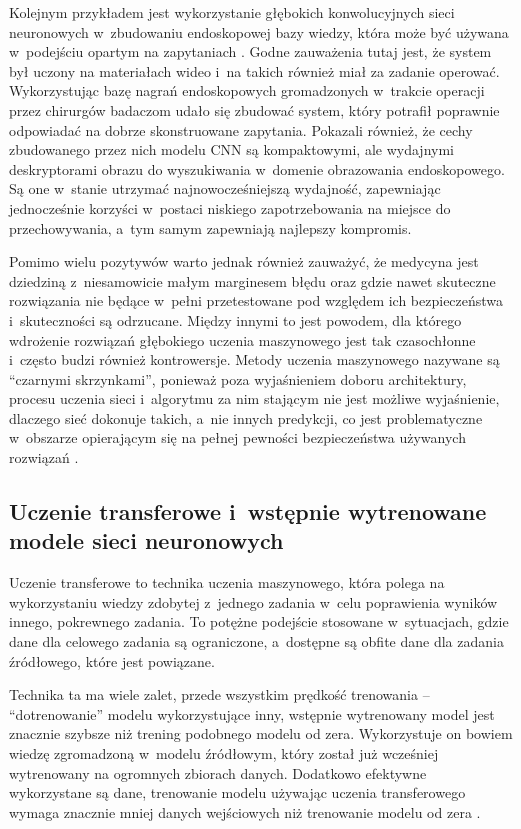 Kolejnym przykładem jest wykorzystanie głębokich konwolucyjnych sieci neuronowych w~zbudowaniu endoskopowej bazy wiedzy, która może być używana w~podejściu opartym na zapytaniach \cite{petscharnig2018binary}.
Godne zauważenia tutaj jest, że system był uczony na materiałach wideo i~na takich również miał za zadanie operować.
Wykorzystując bazę nagrań endoskopowych gromadzonych w~trakcie operacji przez chirurgów badaczom udało się zbudować system, który potrafił poprawnie odpowiadać na dobrze skonstruowane zapytania.
Pokazali również, że cechy zbudowanego przez nich modelu CNN są kompaktowymi, ale wydajnymi deskryptorami obrazu do wyszukiwania w~domenie obrazowania endoskopowego.
Są one w~stanie utrzymać najnowocześniejszą wydajność, zapewniając jednocześnie korzyści w~postaci niskiego zapotrzebowania na miejsce do przechowywania, a~tym samym zapewniają najlepszy kompromis.

Pomimo wielu pozytywów warto jednak również zauważyć, że medycyna jest dziedziną z~niesamowicie małym marginesem błędu oraz gdzie nawet skuteczne rozwiązania nie będące w~pełni przetestowane pod względem ich bezpieczeństwa i~skuteczności są odrzucane.
Między innymi to jest powodem, dla którego wdrożenie rozwiązań głębokiego uczenia maszynowego jest tak czasochłonne i~często budzi również kontrowersje.
Metody uczenia maszynowego nazywane są ``czarnymi skrzynkami'', ponieważ poza wyjaśnieniem doboru architektury, procesu uczenia sieci i~algorytmu za nim stającym nie jest możliwe wyjaśnienie, dlaczego sieć dokonuje takich, a~nie innych predykcji, co jest problematyczne w~obszarze opierającym się na pełnej pewności bezpieczeństwa używanych rozwiązań \cite{pouyanfar2018survey}.

\subsection{Uczenie transferowe i~wstępnie wytrenowane modele sieci neuronowych}
\label{sec:transfer-learning}

Uczenie transferowe to technika uczenia maszynowego, która polega na wykorzystaniu wiedzy zdobytej z~jednego zadania w~celu poprawienia wyników innego, pokrewnego zadania.
To potężne podejście stosowane w~sytuacjach, gdzie dane dla celowego zadania są ograniczone, a~dostępne są obfite dane dla zadania źródłowego, które jest powiązane.

Technika ta ma wiele zalet, przede wszystkim prędkość trenowania -- ``dotrenowanie'' modelu wykorzystujące inny, wstępnie wytrenowany model jest znacznie szybsze niż trening podobnego modelu od zera.
Wykorzystuje on bowiem wiedzę zgromadzoną w~modelu źródłowym, który został już wcześniej wytrenowany na ogromnych zbiorach danych.
Dodatkowo efektywne wykorzystane są dane, trenowanie modelu używając uczenia transferowego wymaga znacznie mniej danych wejściowych niż trenowanie modelu od zera \cite{weiss2016survey}.

